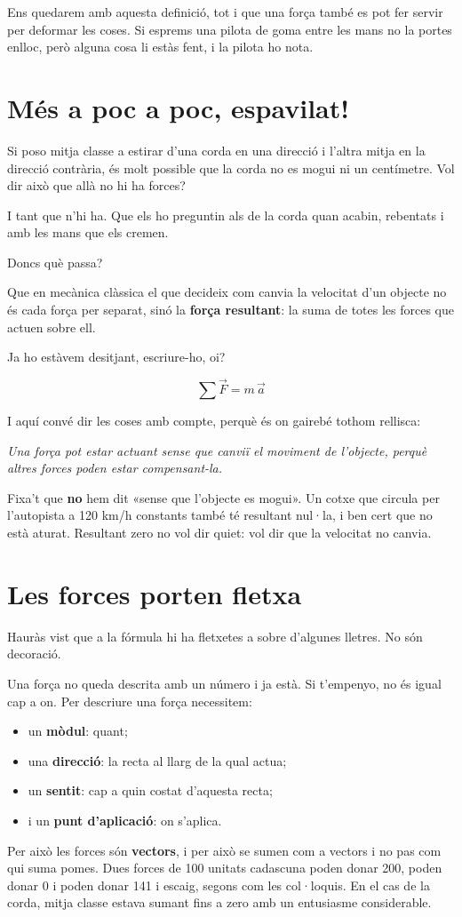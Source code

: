 Ens quedarem amb aquesta definició, tot i que una força també es pot fer servir per deformar les coses. Si esprems una pilota de goma entre les mans no la portes enlloc, però alguna cosa li estàs fent, i la pilota ho nota.

\section{Més a poc a poc, espavilat!}

Si poso mitja classe a estirar d'una corda en una direcció i l'altra mitja en la direcció contrària, és molt possible que la corda no es mogui ni un centímetre. Vol dir això que allà no hi ha forces?

I tant que n'hi ha. Que els ho preguntin als de la corda quan acabin, rebentats i amb les mans que els cremen.

Doncs què passa?

Que en mecànica clàssica el que decideix com canvia la velocitat d'un objecte no és cada força per separat, sinó la \textbf{força resultant}: la suma de totes les forces que actuen sobre ell.

Ja ho estàvem desitjant, escriure-ho, oi?

\[ \sum \vec F = m\,\vec a \]

I aquí convé dir les coses amb compte, perquè és on gairebé tothom rellisca:

\textit{Una força pot estar actuant sense que canviï el moviment de l'objecte, perquè altres forces poden estar compensant-la.}

Fixa't que \textbf{no} hem dit «sense que l'objecte es mogui». Un cotxe que circula per l'autopista a 120 km/h constants també té resultant nul·la, i ben cert que no està aturat. Resultant zero no vol dir quiet: vol dir que la velocitat no canvia.

\section{Les forces porten fletxa}

Hauràs vist que a la fórmula hi ha fletxetes a sobre d'algunes lletres. No són decoració.

Una força no queda descrita amb un número i ja està. Si t'empenyo, no és igual cap a on. Per descriure una força necessitem:

\begin{itemize}
    \item un \textbf{mòdul}: quant;
    \item una \textbf{direcció}: la recta al llarg de la qual actua;
    \item un \textbf{sentit}: cap a quin costat d'aquesta recta;
    \item i un \textbf{punt d'aplicació}: on s'aplica.
\end{itemize}
Per això les forces són \textbf{vectors}, i per això se sumen com a vectors i no pas com qui suma pomes. Dues forces de 100 unitats cadascuna poden donar 200, poden donar 0 i poden donar 141 i escaig, segons com les col·loquis. En el cas de la corda, mitja classe estava sumant fins a zero amb un entusiasme considerable.

